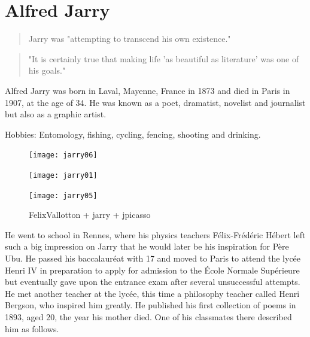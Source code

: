 \section{Alfred Jarry}

\begin{quote}
  Jarry was "attempting to transcend his own existence." \citep{Hugill2012}
\end{quote}

\begin{quote}
  "It is certainly true that making life 'as beautiful as literature' was one of his goals." \citep{Hugill2012}
\end{quote}

Alfred Jarry was born in Laval, Mayenne, France in 1873 and died in Paris in 1907, at the age of 34. He was known as a poet, dramatist, novelist and journalist but also as a graphic artist.

Hobbies: Entomology, fishing, cycling, fencing, shooting and drinking.

\begin{figure}[htb]
  \centering
  \begin{minipage}{.275\linewidth}
    \texttt{[image: jarry06]}
  \end{minipage}
  \hspace{.05\linewidth}
  \begin{minipage}{.275\linewidth}
    \texttt{[image: jarry01]}
  \end{minipage}
  \hspace{.05\linewidth}
  \begin{minipage}{.275\linewidth}
    \texttt{[image: jarry05]}
  \end{minipage}
  \caption[figures1-3]{FelixVallotton + jarry + jpicasso}
  \label{img123}
\end{figure}

He went to school in Rennes, where his physics teachers Félix-Frédéric Hébert left such a big impression on Jarry that he would later be his inspiration for Père Ubu. He passed his baccalauréat with 17 and moved to Paris to attend the lycée Henri IV in preparation to apply for admission to the École Normale Supérieure but eventually gave upon the entrance exam after several unsuccessful attempts. He met another teacher at the lycée, this time a philosophy teacher called Henri Bergson, who inspired him greatly. He published his first collection of poems in 1893, aged 20, the year his mother died. One of his classmates there described him as follows.

